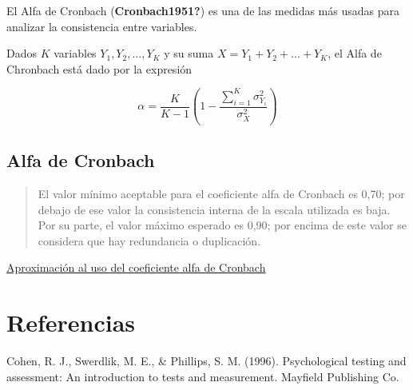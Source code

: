 \documentclass[
  letterpaper,
  DIV=11,
  numbers=noendperiod]{scrreprt}
\begin{document}
El Alfa de Cronbach (\textbf{Cronbach1951?}) es una de las medidas más
usadas para analizar la consistencia entre variables.

Dados \(K\) variables \(Y_1, Y_2, ..., Y_K\) y su suma
\(X = Y_1 + Y_2 + ... + Y_K\), el Alfa de Chronbach está dado por la
expresión

\[\alpha = \frac{K}{K-1} \left(1-\frac{\sum_{i = 1}^K \sigma^2_{Y_i}}{\sigma^2_X}\right)\]

\section{Alfa de Cronbach}\label{alfa-de-cronbach}

\begin{quote}
El valor mínimo aceptable para el coeficiente alfa de Cronbach es 0,70;
por debajo de ese valor la consistencia interna de la escala utilizada
es baja. Por su parte, el valor máximo esperado es 0,90; por encima de
este valor se considera que hay redundancia o duplicación.
\end{quote}

\href{http://scielo.org.co/pdf/rcp/v34n4/v34n4a09.pdf}{Aproximación al
uso del coeficiente alfa de Cronbach}


\chapter{Referencias}\label{referencias}

Cohen, R. J., Swerdlik, M. E., \& Phillips, S. M. (1996). Psychological
testing and assessment: An introduction to tests and measurement.
Mayfield Publishing Co.
\end{document}
